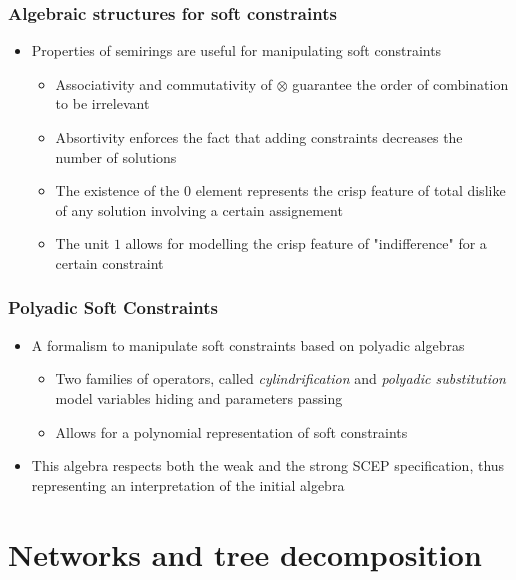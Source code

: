 \documentclass{beamer}
\begin{document}
\begin{frame}
\frametitle{Algebraic structures for soft constraints}
\begin{itemize}
	\item Properties of semirings are useful for manipulating soft constraints
	\begin{itemize}
		\item Associativity and commutativity of $\otimes$ guarantee the order of combination
		to be irrelevant
		\item Absortivity enforces the fact that adding constraints decreases the number of
		solutions
		\item The existence of the $0$ element represents the crisp feature of total dislike
		of any solution involving a certain assignement
		\item The unit $1$ allows for modelling the crisp feature of "indifference" for a
		certain constraint
	\end{itemize}
\end{itemize}
\end{frame}

\begin{frame}
\frametitle{Polyadic Soft Constraints}
\begin{itemize}
	\item A formalism to manipulate soft constraints based on polyadic algebras
	\begin{itemize}
		\item Two families of operators, called \emph{cylindrification} and 
		\emph{polyadic substitution} model variables hiding and parameters passing
		\item Allows for a polynomial representation of soft constraints
	\end{itemize}
\medskip
	\item This algebra respects both the weak and the strong
	SCEP specification, thus representing an interpretation of the initial algebra
\end{itemize}
\end{frame}

\section{Networks and tree decomposition}
\end{document}
